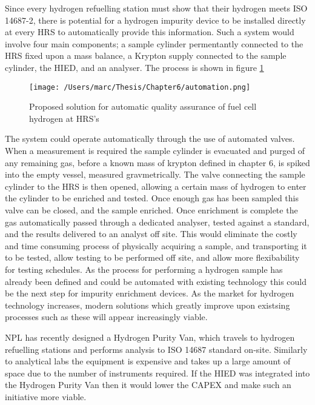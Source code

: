 Since every hydrogen refuelling station must show that their hydrogen meets ISO 14687-2, there is potential for a hydrogen impurity device to be installed directly at every HRS to automatically provide this information. Such a system would involve four main components; a sample cylinder permentantly connected to the HRS fixed upon a mass balance, a Krypton supply connected to the sample cylinder, the HIED, and an analyser. The process is shown in figure \ref{autoprocedure}

\begin{figure}
    \centering
    \texttt{[image: /Users/marc/Thesis/Chapter6/automation.png]}
    \caption{Proposed solution for automatic quality assurance of fuel cell hydrogen at HRS's}
    \label{autoprocedure}
\end{figure}

The system could operate automatically through the use of automated valves. When a measurement is required the sample cylinder is evacuated and purged of any remaining gas, before a known mass of krypton defined in chapter 6, is spiked into the empty vessel, measured gravmetrically. The valve connecting the sample cylinder to the HRS is then opened, allowing a certain mass of hydrogen to enter the cylinder to be enriched and tested. Once enough gas has been sampled this valve can be closed, and the sample enriched. Once enrichment is complete the gas automatically passed through a dedicated analyser, tested against a standard, and the results delivered to an analyst off site. This would eliminate the costly and time consuming process of physically acquiring a sample, and transporting it to be tested, allow testing to be performed off site, and allow more flexibability for testing schedules. As the process for performing a hydrogen sample has already been defined \cite{BACQUART20205565} and could be automated with existing technology this could be the next step for impurity enrichment devices. As the market for hydrogen technology increases, modern solutions which greatly improve upon existsing processes such as these will appear increasingly viable.

NPL has recently designed a Hydrogen Purity Van, which travels to hydrogen refuelling stations and performs analysis to ISO 14687 standard on-site. Similarly to analytical labs the equipment is expensive and takes up a large amount of space due to the number of instruments required. If the HIED was integrated into the Hydrogen Purity Van then it would lower the CAPEX and make such an initiative more viable. 

